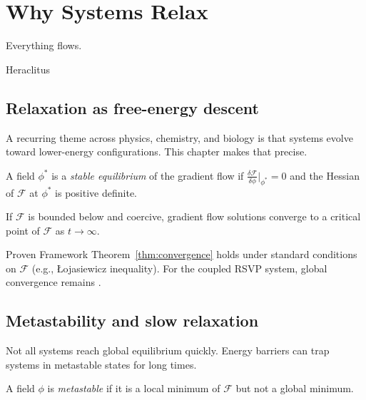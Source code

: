 
\chapter{Why Systems Relax}
\label{ch:relaxation}

\epigraph{%
  Everything flows.%
}{Heraclitus}

\section{Relaxation as free-energy descent}

A recurring theme across physics, chemistry, and biology is that
systems evolve toward lower-energy configurations.
This chapter makes that precise.

\begin{definition}
  A field $\phi^*$ is a \emph{stable equilibrium} of the
  gradient flow if $\frac{\delta\mathcal{F}}{\delta\phi}\big|_{\phi^*} = 0$
  and the Hessian of $\mathcal{F}$ at $\phi^*$ is positive definite.
\end{definition}

\begin{theorem}
  \label{thm:convergence}
  If $\mathcal{F}$ is bounded below and coercive, gradient flow
  solutions converge to a critical point of $\mathcal{F}$ as
  $t \to \infty$.
\end{theorem}

\begin{StatusBox}{Proven Framework}
  Theorem~\ref{thm:convergence} holds under standard conditions
  on $\mathcal{F}$ (e.g., Łojasiewicz inequality).
  For the coupled RSVP system, global convergence remains
  \statusconjectured{}.
\end{StatusBox}

\section{Metastability and slow relaxation}

Not all systems reach global equilibrium quickly.
Energy barriers can trap systems in metastable states for
long times.

\begin{definition}
  A field $\phi$ is \emph{metastable} if it is a local minimum
  of $\mathcal{F}$ but not a global minimum.
\end{definition}

